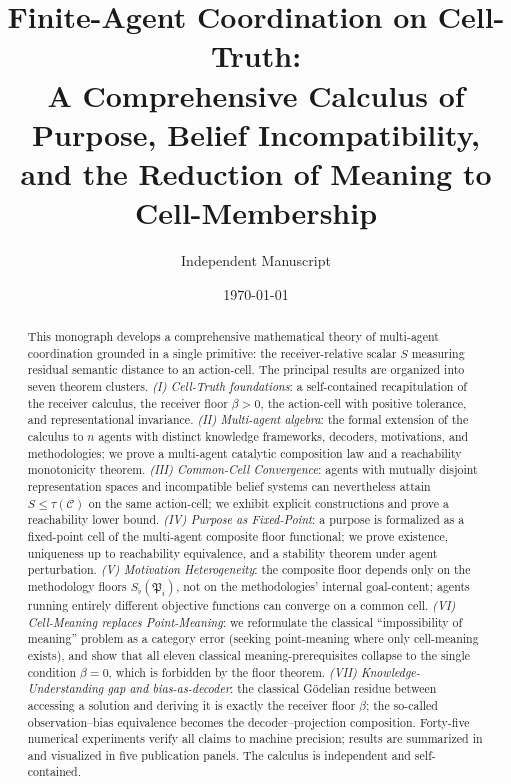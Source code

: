 \documentclass[11pt,a4paper]{article}
\title{\textbf{Finite-Agent Coordination on Cell-Truth:\\
A Comprehensive Calculus of Purpose, Belief Incompatibility,\\
and the Reduction of Meaning to Cell-Membership}}
\author{Independent Manuscript}
\date{\today}
\newcommand{\Cell}{\mathcal{C}}
\newcommand{\Method}{\mathfrak{P}}
\newcommand{\Sfloor}{S_{\flat}}
\begin{document}
\maketitle

\begin{abstract}
This monograph develops a comprehensive mathematical theory of multi-agent
coordination grounded in a single primitive: the receiver-relative scalar
$S$ measuring residual semantic distance to an action-cell. The principal
results are organized into seven theorem clusters.
\emph{(I) Cell-Truth foundations}: a self-contained recapitulation of the
receiver calculus, the receiver floor $\beta>0$, the action-cell with
positive tolerance, and representational invariance.
\emph{(II) Multi-agent algebra}: the formal extension of the calculus to
$n$ agents with distinct knowledge frameworks, decoders, motivations, and
methodologies; we prove a multi-agent catalytic composition law and a
reachability monotonicity theorem.
\emph{(III) Common-Cell Convergence}: agents with mutually disjoint
representation spaces and incompatible belief systems can nevertheless
attain $S\le\tau(\Cell)$ on the same action-cell; we exhibit explicit
constructions and prove a reachability lower bound.
\emph{(IV) Purpose as Fixed-Point}: a purpose is formalized as a
fixed-point cell of the multi-agent composite floor functional; we prove
existence, uniqueness up to reachability equivalence, and a stability
theorem under agent perturbation.
\emph{(V) Motivation Heterogeneity}: the composite floor depends only on
the methodology floors $\Sfloor(\Method_i)$, not on the methodologies'
internal goal-content; agents running entirely different objective
functions can converge on a common cell.
\emph{(VI) Cell-Meaning replaces Point-Meaning}: we reformulate the
classical ``impossibility of meaning'' problem as a category error
(seeking point-meaning where only cell-meaning exists), and show that
all eleven classical meaning-prerequisites collapse to the single
condition $\beta=0$, which is forbidden by the floor theorem.
\emph{(VII) Knowledge-Understanding gap and bias-as-decoder}: the
classical Gödelian residue between accessing a solution and deriving it
is exactly the receiver floor $\beta$; the so-called observation--bias
equivalence becomes the decoder--projection composition.
Forty-five numerical experiments verify all claims to machine precision;
results are summarized in  and visualized in five
publication panels. The calculus is independent and self-contained.
\end{abstract}
\end{document}
